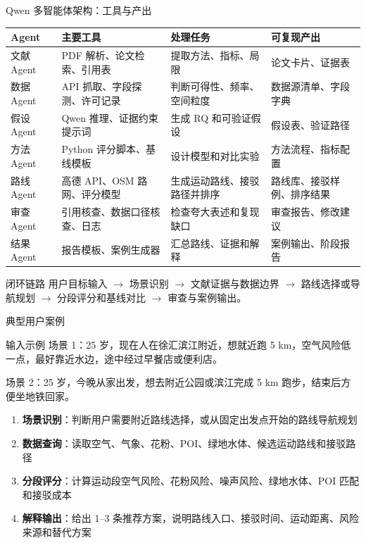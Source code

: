 \documentclass[xcolor=table,dvipsnames,svgnames,aspectratio=169]{ctexbeamer}
\newcommand{\kw}[1]{\textbf{\color{cprimary}#1}}
\newcommand{\smallitem}{\setlength{\itemsep}{0.25em}}
\begin{document}
\begin{frame}{Qwen 多智能体架构：工具与产出}
  \scriptsize
  \begin{tabularx}{\textwidth}{p{}p{}p{}Y}
    \toprule
    Agent & 主要工具 & 处理任务 & 可复现产出 \\
    \midrule
    文献 Agent & PDF 解析、论文检索、引用表 & 提取方法、指标、局限 & 论文卡片、证据表 \\
    数据 Agent & API 抓取、字段探测、许可记录 & 判断可得性、频率、空间粒度 & 数据源清单、字段字典 \\
    假设 Agent & Qwen 推理、证据约束提示词 & 生成 RQ 和可验证假设 & 假设表、验证路径 \\
    方法 Agent & Python 评分脚本、基线模板 & 设计模型和对比实验 & 方法流程、指标配置 \\
    路线 Agent & 高德 API、OSM 路网、评分模型 & 生成运动路线、接驳路径并排序 & 路线库、接驳样例、排序结果 \\
    审查 Agent & 引用核查、数据口径核查、日志 & 检查夸大表述和复现缺口 & 审查报告、修改建议 \\
    结果 Agent & 报告模板、案例生成器 & 汇总路线、证据和解释 & 案例输出、阶段报告 \\
    \bottomrule
  \end{tabularx}

  \vspace{0.35em}
  \begin{block}{闭环链路}
    用户目标输入 $\rightarrow$ 场景识别 $\rightarrow$ 文献证据与数据边界 $\rightarrow$ 路线选择或导航规划 $\rightarrow$ 分段评分和基线对比 $\rightarrow$ 审查与案例输出。
  \end{block}
\end{frame}

\begin{frame}{典型用户案例}
  \begin{block}{输入示例}
    场景 1：25 岁，现在人在徐汇滨江附近，想就近跑 5 km，空气风险低一点，最好靠近水边，途中经过早餐店或便利店。

    \vspace{0.35em}
    场景 2：25 岁，今晚从家出发，想去附近公园或滨江完成 5 km 跑步，结束后方便坐地铁回家。
  \end{block}

  \vspace{0.4em}
  \small
  \begin{enumerate}
    \smallitem
    \item \kw{场景识别}：判断用户需要附近路线选择，或从固定出发点开始的路线导航规划
    \item \kw{数据查询}：读取空气、气象、花粉、POI、绿地水体、候选运动路线和接驳路径
    \item \kw{分段评分}：计算运动段空气风险、花粉风险、噪声风险、绿地水体、POI 匹配和接驳成本
    \item \kw{解释输出}：给出 1--3 条推荐方案，说明路线入口、接驳时间、运动距离、风险来源和替代方案
  \end{enumerate}
\end{frame}
\end{document}
